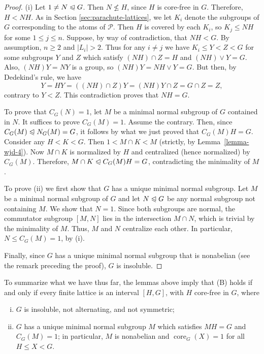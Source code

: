 \documentclass[11pt]{amsart}
\theoremstyle{plain}
\theoremstyle{definition}
\theoremstyle{remark}
\numberwithin{theorem}{section}
\numberwithin{claim}{section}
\numberwithin{equation}{section}
\numberwithin{conjecture}{section}
\newcommand{\<}{\ensuremath{\langle}}
\renewcommand{\>}{\ensuremath{\rangle}}
\renewcommand{\leq}{\ensuremath{\leqslant}}
\renewcommand{\nleq}{\ensuremath{\nleqslant}}
\renewcommand{\geq}{\ensuremath{\geqslant}}
\newcommand{\subnormal}{\ensuremath{\trianglelefteqslant}}
\newcommand{\join}{\ensuremath{\vee}}
\newcommand{\core}{\ensuremath{\operatorname{core}}}
\newcommand{\0}{\ensuremath{\mathbf{0}}}
\newcommand{\1}{\ensuremath{\mathbf{1}}}
\newcommand{\2}{\ensuremath{\mathbf{2}}}
\newcommand{\3}{\ensuremath{\mathbf{3}}}
\newcommand{\4}{\ensuremath{\mathbf{4}}}
\newcommand{\5}{\ensuremath{\mathbf{5}}}
\newcommand{\sP}{\ensuremath{\mathscr{P}}}
\begin{document}
\begin{proof}
(i)
Let $1\neq N \subnormal G$.  Then $N \nleq H$, since $H$ is core-free in $G$.
Therefore, $H < NH$.   As in Section \ref{sec:parachute-lattices}, we let $K_i$
denote the subgroups of $G$ 
corresponding to the atoms of $\sP$.  
Then $H$ is covered by each $K_i$, so $K_j\leq NH$ for some $1\leq j\leq n$.  
Suppose, by way of contradiction, that $NH < G$.  
By assumption, $n\geq 2$ and $|L_i|>2$.  Thus for any $i\neq j$ we have
$K_i\leq Y < Z < G$ for some subgroups $Y$ and $Z$ which satisfy
$(NH)\cap Z = H$ and $(NH)\join Y = G$.  Also, $(NH)Y = NY$ is a group, so
$(NH)Y=NH\join Y = G$.  But then, by Dedekind's rule, we have
\[
Y = HY = ((NH)\cap Z) Y = (NH)Y \cap Z = G\cap Z = Z,
\]
contrary to $Y<Z$.  This contradiction proves that $NH = G$.

To prove that $C_G(N)=1$, let $M$ be a minimal normal subgroup of $G$
contained in $N$.  It suffices to prove $C_G(M)= 1$.
Assume the contrary. Then, 
since $C_G(M) \subnormal N_G(M) =G$, it follows by
what we just proved that $C_G(M)H = G$.
Consider any $H< K < G$. Then $1 < M\cap K < M$ (strictly, by
Lemma~\ref{lemma-wjd-4}). Now $M\cap K$ is normalized by $H$ and centralized
(hence normalized) by $C_G(M)$.  
Therefore, $M\cap K \subnormal C_G(M)H = G$, contradicting the minimality of
$M$.  

To prove (ii) we first show that $G$ has a unique minimal normal subgroup.  Let
$M$ be a minimal
normal subgroup of $G$ and let $N \subnormal G$ be any normal subgroup not 
containing $M$.  We show that $N = 1$.  Since both subgroups
are normal, the commutator subgroup
$[M,N]$
lies in the intersection $M\cap N$, which is trivial by the minimality of $M$.   
Thus, $M$ and $N$ centralize each other.  In particular,
$N \leq C_G(M) = 1$, by (i).

Finally, since $G$ has a unique
minimal normal subgroup that is nonabelian 
(see the remark preceding the proof),
$G$ is insoluble.
\end{proof}

To summarize what we have thus far, the lemmas above imply that (B) holds if and only if
every finite lattice is an interval $[H, G]$, with $H$ core-free in $G$, where
\begin{enumerate}[(i)]
\item $G$ is insoluble, not alternating, and not symmetric;
\item $G$ has a unique minimal normal subgroup $M$ which satisfies $MH = G$
and $C_G(M) = 1$; in particular,
$M$ is nonabelian and $\core_G(X) = 1$ for all $H\leq X < G$.
\end{enumerate}
\end{document}
